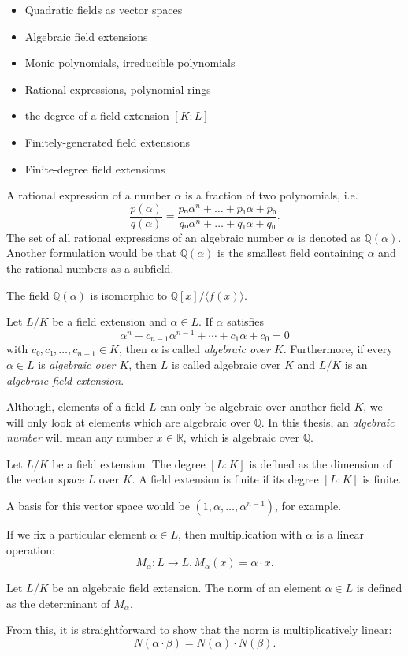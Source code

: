 \begin{itemize}
  \item Quadratic fields as vector spaces
  \item Algebraic field extensions
  \item Monic polynomials, irreducible polynomials
  \item Rational expressions, polynomial rings
  \item the degree of a field extension $[K : L]$
  \item Finitely-generated field extensions
  \item Finite-degree field extensions
\end{itemize}

A rational expression of a number $α$ is a fraction of two polynomials, i.e.
\[
  \frac{p(α)}{q(α)} = \frac{pₙ α^n + \dots + p₁ α + p₀}{qₙ α^n + \dots + q₁ α + q₀}.
\]
The set of all rational expressions of an algebraic number $α$ is denoted as $ℚ(α)$.
Another formulation would be that $ℚ(α)$ is the smallest field containing $α$
and the rational numbers as a subfield.

\begin{theorem}
  The field $ℚ(α)$ is isomorphic to $ℚ[x]/⟨f(x)⟩$.
\end{theorem}

\begin{definition}
  Let $L/K$ be a field extension and $α ∈ L$.
  If $α$ satisfies
  \[
    α^n + c_{n-1} α^{n-1} + ⋯ + c_1 α + c_0 = 0
  \]
  with $c₀, c₁, …, c_{n-1} ∈ K$,
  then $α$ is called \emph{algebraic over $K$}.
  Furthermore, if every $α ∈ L$ is \emph{algebraic over $K$}, then $L$ is called
  algebraic over $K$ and $L/K$ is an \emph{algebraic field extension}.
\end{definition}

Although, elements of a field $L$ can only be algebraic over another field $K$,
we will only look at elements which are algebraic over $ℚ$.
In this thesis, an \emph{algebraic number} will mean any number $x ∈ ℝ$, which
is algebraic over $ℚ$.

\begin{definition}
  Let $L/K$ be a field extension.
  The degree $[L : K]$ is defined as the dimension of the vector space $L$ over $K$.
  A field extension is finite if its degree $[L : K]$ is finite.
\end{definition}

A basis for this vector space would be $(1, α, …, α^{n-1})$, for example.

If we fix a particular element $α ∈ L$, then multiplication with $α$ is a linear operation:
\[
  M_α : L → L, M_α(x) = α · x.
\]

\begin{definition}
  Let $L/K$ be an algebraic field extension.
  The norm of an element $α ∈ L$ is defined as the determinant of $M_α$.
\end{definition}

From this, it is straightforward to show that the norm is multiplicatively linear:
\[
  N(α · β) = N(α) · N(β).
\]

